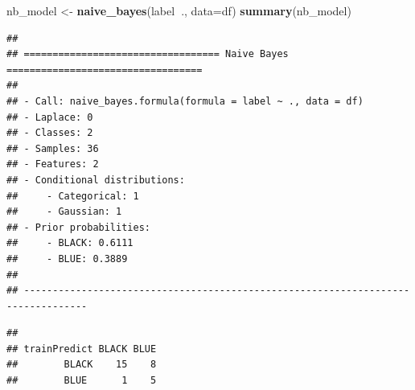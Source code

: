 \documentclass[
]{article}
\newenvironment{Shaded}{\begin{snugshade}}{\end{snugshade}}
\newcommand{\CommentTok}[1]{\textcolor[rgb]{0.56,0.35,0.01}{\textit{#1}}}
\newcommand{\DataTypeTok}[1]{\textcolor[rgb]{0.13,0.29,0.53}{#1}}
\newcommand{\KeywordTok}[1]{\textcolor[rgb]{0.13,0.29,0.53}{\textbf{#1}}}
\newcommand{\NormalTok}[1]{#1}
\newcommand{\OperatorTok}[1]{\textcolor[rgb]{0.81,0.36,0.00}{\textbf{#1}}}
\newcommand{\OtherTok}[1]{\textcolor[rgb]{0.56,0.35,0.01}{#1}}
\newcommand{\StringTok}[1]{\textcolor[rgb]{0.31,0.60,0.02}{#1}}
\begin{document}
\begin{Shaded}
\begin{Highlighting}[]
\NormalTok{nb_model <-}\StringTok{ }\KeywordTok{naive_bayes}\NormalTok{(label}\OperatorTok{~}\NormalTok{., }\DataTypeTok{data=}\NormalTok{df)}
\KeywordTok{summary}\NormalTok{(nb_model)}
\end{Highlighting}
\end{Shaded}

\begin{verbatim}
## 
## ================================== Naive Bayes ================================== 
##  
## - Call: naive_bayes.formula(formula = label ~ ., data = df) 
## - Laplace: 0 
## - Classes: 2 
## - Samples: 36 
## - Features: 2 
## - Conditional distributions: 
##     - Categorical: 1
##     - Gaussian: 1
## - Prior probabilities: 
##     - BLACK: 0.6111
##     - BLUE: 0.3889
## 
## ---------------------------------------------------------------------------------
\end{verbatim}

\begin{Shaded}
\end{Shaded}

\begin{verbatim}
##             
## trainPredict BLACK BLUE
##        BLACK    15    8
##        BLUE      1    5
\end{verbatim}

\begin{Shaded}
\end{Shaded}
\end{document}
